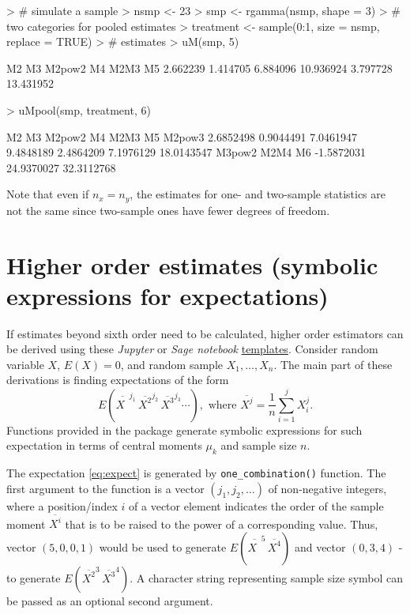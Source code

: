 \documentclass[12pt]{article}
\begin{document}
\begin{Schunk}
\begin{Sinput}
> # simulate a sample
> nsmp <- 23
> smp <- rgamma(nsmp, shape = 3)
> # two categories for pooled estimates
> treatment <- sample(0:1, size = nsmp, replace = TRUE)
> # estimates
> uM(smp, 5)
\end{Sinput}
\begin{Soutput}
       M2        M3    M2pow2        M4      M2M3        M5 
 2.662239  1.414705  6.884096 10.936924  3.797728 13.431952 
\end{Soutput}
\begin{Sinput}
> uMpool(smp, treatment, 6)
\end{Sinput}
\begin{Soutput}
        M2         M3     M2pow2         M4       M2M3         M5     M2pow3 
 2.6852498  0.9044491  7.0461947  9.4848189  2.4864209  7.1976129 18.0143547 
    M3pow2       M2M4         M6 
-1.5872031 24.9370027 32.3112768 
\end{Soutput}
\end{Schunk}

Note that even if $n_x = n_y$, the estimates for one- and two-sample statistics are not the same since two-sample ones have fewer degrees of freedom.

\section{Higher order estimates (symbolic expressions for expectations)}

If estimates beyond sixth order need to be calculated, higher order estimators can be derived using these  \textit{Jupyter} or \textit{Sage notebook} \href{https://github.com/innager/unbiasedMoments}{templates}. Consider random variable $X$, $E(X) = 0$, and random sample $X_1, \dotsc, X_n$. The main part of these derivations is finding expectations of the form
\begin{equation} \label{eq:expect}
E\left(\overline{X^{\phantom{1}}}^{j_1} \, \overline{X^2}^{j_2} \, \overline{X^3}^{j_3} \dotsm \right), \text{ where } \overline{X^j} = \frac{1}{n} \sum_{i = 1}^j X_i^j.
\end{equation}
Functions provided in the package generate symbolic expressions for such expectation in terms of central moments $\mu_k$ and sample size $n$. \par
\vspace{1em}

The expectation \eqref{eq:expect} is generated by \texttt{one\_combination()} function. The first argument to the function is a vector $(j_1, j_2, \dotsc)$ of non-negative integers, where a position/index $i$ of a vector element indicates the order of the sample moment $\overline{X^i}$ that is to be raised to the power of a corresponding value. Thus, vector $(5, 0, 0, 1)$ would be used to generate $E\left(\overline{X^{\phantom{1}}}^5 \, \overline{X^4}\right)$ and vector $(0, 3, 4)$ - to generate $E\left(\overline{X^2}^3 \, \overline{X^3}^4\right)$. A character string representing sample size symbol can be passed as an optional second argument. \par
\vspace{1em}
\end{document}
